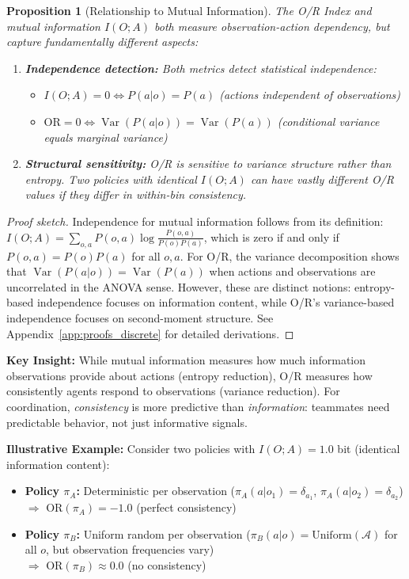 \documentclass[twoside]{article}
\DeclareMathOperator{\Var}{Var}
\newtheorem{proposition}{Proposition}
\theoremstyle{remark}
\begin{document}
\begin{proposition}[Relationship to Mutual Information]
\label{prop:mi_connection}
The O/R Index and mutual information $I(O; A)$ both measure observation-action dependency, but capture fundamentally different aspects:
\begin{enumerate}
    \item \textbf{Independence detection:} Both metrics detect statistical independence:
    \begin{itemize}
        \item $I(O; A) = 0 \iff P(a|o) = P(a)$ (actions independent of observations)
        \item $\mathrm{OR} = 0 \iff \Var(P(a|o)) = \Var(P(a))$ (conditional variance equals marginal variance)
    \end{itemize}
    \item \textbf{Structural sensitivity:} O/R is sensitive to \emph{variance structure} rather than \emph{entropy}. Two policies with identical $I(O; A)$ can have vastly different O/R values if they differ in within-bin consistency.
\end{enumerate}
\end{proposition}

\begin{proof}[Proof sketch]
Independence for mutual information follows from its definition: $I(O; A) = \sum_{o,a} P(o,a) \log \frac{P(o,a)}{P(o)P(a)}$, which is zero if and only if $P(o,a) = P(o)P(a)$ for all $o, a$. For O/R, the variance decomposition shows that $\Var(P(a|o)) = \Var(P(a))$ when actions and observations are uncorrelated in the ANOVA sense. However, these are distinct notions: entropy-based independence focuses on information content, while O/R's variance-based independence focuses on second-moment structure. See Appendix~\ref{app:proofs_discrete} for detailed derivations.
\end{proof}

\textbf{Key Insight:} While mutual information measures how much information observations provide about actions (entropy reduction), O/R measures how consistently agents respond to observations (variance reduction). For coordination, \emph{consistency} is more predictive than \emph{information}: teammates need predictable behavior, not just informative signals.

\textbf{Illustrative Example:} Consider two policies with $I(O; A) = 1.0$ bit (identical information content):
\begin{itemize}
    \item \textbf{Policy $\pi_A$:} Deterministic per observation ($\pi_A(a|o_1) = \delta_{a_1}$, $\pi_A(a|o_2) = \delta_{a_2}$) \\
    $\Rightarrow$ $\mathrm{OR}(\pi_A) = -1.0$ (perfect consistency)
    \item \textbf{Policy $\pi_B$:} Uniform random per observation ($\pi_B(a|o) = \text{Uniform}(\mathcal{A})$ for all $o$, but observation frequencies vary) \\
    $\Rightarrow$ $\mathrm{OR}(\pi_B) \approx 0.0$ (no consistency)
\end{itemize}
\end{document}
